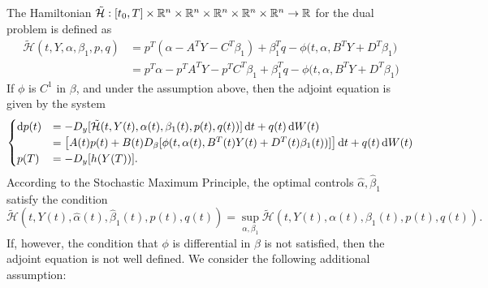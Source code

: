 The Hamiltonian $\tilde{\mathcal{H}}: [t_0, T] \times \mathbb{R}^n \times \mathbb{R}^{n}\times \mathbb{R}^n \times \mathbb{R}^n \times \mathbb{R}^{n} \to \mathbb{R}$ for the dual problem is defined as
\begin{align*}
    \tilde{\mathcal{H}}(t, Y, \alpha, \beta_1, p, q) 
    &=  p^T(\alpha - A^T Y - C^T \beta_1) +  \beta_1^T q -\phi \bigg(t, \alpha, B^T Y + D^T \beta_1 \bigg)\\
    &= p^T\alpha - p^T A^T Y - p^T C^T\beta_1   + \beta_1^T q - \phi \bigg(t, \alpha, B^T Y + D^T \beta_1 \bigg)
\end{align*}
If $\phi$ is $C^1$ in $\beta$, and under the assumption above, then the adjoint equation is given by the system
\begin{equation}
    \begin{cases}
        \mathop{}\!\mathrm{d} p(t) &= -D_y [\tilde{\mathcal{H}}(t, Y(t), \alpha(t), \beta_1(t), p(t), q(t))] \mathop{}\!\mathrm{d} t + q(t) \mathop{}\!\mathrm{d} W(t)  \\
        &= \big[A(t) p(t) + B(t) D_{\beta} [\phi (t, \alpha(t), B^T(t) Y(t) + D^T(t) \beta_1(t) )] \big] \mathop{}\!\mathrm{d} t + q(t) \mathop{}\!\mathrm{d} W(t)\\
        p(T) &= - D_y[h(Y(T))].
    \end{cases} \label{eq: constrained_dual_adjoint_process_1} 
\end{equation}
According to the Stochastic Maximum Principle, the optimal controls $\hat{\alpha}, \hat{\beta}_1$ satisfy the condition
\begin{equation*}
     \tilde{\mathcal{H}}(t, Y(t), \hat{\alpha}(t), \hat{\beta}_1(t), p(t), q(t))  = \sup_{\alpha, \beta_1}  \tilde{\mathcal{H}}(t, Y(t), \alpha(t), \beta_1(t), p(t), q(t)).
\end{equation*}
If, however, the condition that $\phi$ is differential in $\beta$ is not satisfied, then the adjoint equation is not well defined. We consider the following additional assumption:\\

